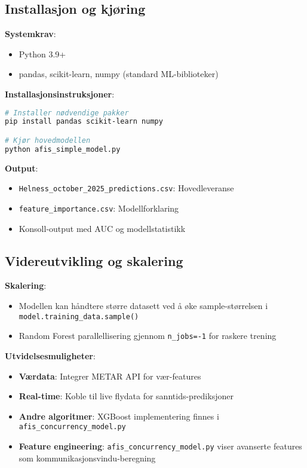 \documentclass[11pt,a4paper]{article}
\begin{document}
\subsection{Installasjon og kjøring}

\textbf{Systemkrav}:
\begin{itemize}
    \item Python 3.9+
    \item pandas, scikit-learn, numpy (standard ML-biblioteker)
\end{itemize}

\textbf{Installasjonsinstruksjoner}:
\begin{lstlisting}[language=bash]
# Installer nødvendige pakker
pip install pandas scikit-learn numpy

# Kjør hovedmodellen
python afis_simple_model.py
\end{lstlisting}

\textbf{Output}:
\begin{itemize}
    \item \texttt{Helness\_october\_2025\_predictions.csv}: Hovedleveranse
    \item \texttt{feature\_importance.csv}: Modellforklaring
    \item Konsoll-output med AUC og modellstatistikk
\end{itemize}

\subsection{Videreutvikling og skalering}

\textbf{Skalering}:
\begin{itemize}
    \item Modellen kan håndtere større datasett ved å øke sample-størrelsen i \texttt{model.training\_data.sample()}
    \item Random Forest parallellisering gjennom \texttt{n\_jobs=-1} for raskere trening
\end{itemize}

\textbf{Utvidelsesmuligheter}:
\begin{itemize}
    \item \textbf{Værdata}: Integrer METAR API for vær-features
    \item \textbf{Real-time}: Koble til live flydata for sanntids-prediksjoner
    \item \textbf{Andre algoritmer}: XGBoost implementering finnes i \texttt{afis\_concurrency\_model.py}
    \item \textbf{Feature engineering}: \texttt{afis\_concurrency\_model.py} viser avanserte features som kommunikasjonsvindu-beregning
\end{itemize}
\end{document}
